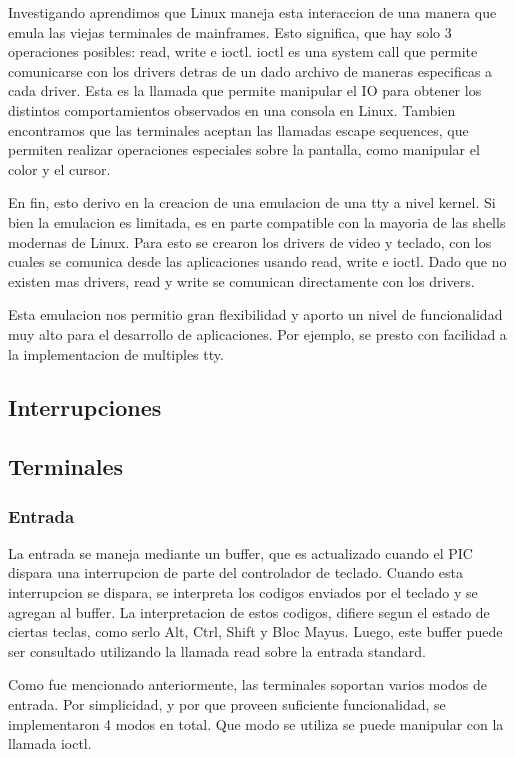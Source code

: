 \documentclass[a4paper,10pt]{article}
\begin{document}
    Investigando aprendimos que Linux maneja esta interaccion de una manera que emula las viejas terminales de mainframes. 
    Esto significa, que hay solo 3 operaciones posibles: read, write e ioctl.
    ioctl es una system call que permite comunicarse con los drivers detras de un dado archivo de maneras especificas a cada driver.
    Esta es la llamada que permite manipular el IO para obtener los distintos comportamientos observados en una consola en Linux.
    Tambien encontramos que las terminales aceptan las llamadas escape sequences, que permiten realizar operaciones especiales sobre la pantalla, como manipular el color y el cursor.

    En fin, esto derivo en la creacion de una emulacion de una tty a nivel kernel.
    Si bien la emulacion es limitada, es en parte compatible con la mayoria de las shells modernas de Linux.
    Para esto se crearon los drivers de video y teclado, con los cuales se comunica desde las aplicaciones usando read, write e ioctl.
    Dado que no existen mas drivers, read y write se comunican directamente con los drivers.

    Esta emulacion nos permitio gran flexibilidad y aporto un nivel de funcionalidad muy alto para el desarrollo de aplicaciones.
    Por ejemplo, se presto con facilidad a la implementacion de multiples tty.

    \subsection{Interrupciones}

    \subsection{Terminales}
        \subsubsection{Entrada}
            La entrada se maneja mediante un buffer, que es actualizado cuando el PIC dispara una interrupcion de parte del controlador de teclado.
            Cuando esta interrupcion se dispara, se interpreta los codigos enviados por el teclado y se agregan al buffer.
            La interpretacion de estos codigos, difiere segun el estado de ciertas teclas, como serlo Alt, Ctrl, Shift y Bloc Mayus.
            Luego, este buffer puede ser consultado utilizando la llamada read sobre la entrada standard.

            Como fue mencionado anteriormente, las terminales soportan varios modos de entrada.
            Por simplicidad, y por que proveen suficiente funcionalidad, se implementaron 4 modos en total.
            Que modo se utiliza se puede manipular con la llamada ioctl.
\end{document}
